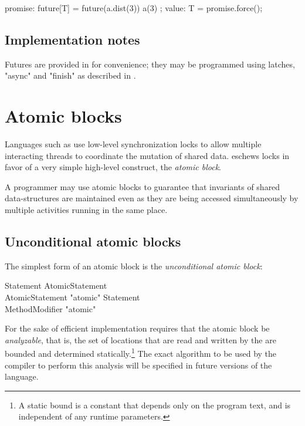 \begin{xten}
promise: future[T]
  = future(a.dist(3)) { a(3) };
value: T = promise.force();
\end{xten}

\subsection{Implementation notes}
Futures are provided in \Xten{} for convenience; they may be
programmed using latches, \xcd"async" and \xcd"finish" as
described in .

\section{Atomic blocks}\label{AtomicBlocks}
Languages such as \java{} use low-level synchronization locks to allow
multiple interacting threads to coordinate the mutation of shared
data. \Xten{} eschews locks in favor of a very simple high-level
construct, the {\em atomic block}.

A programmer may use atomic blocks to guarantee that invariants of
shared data-structures are maintained even as they are being accessed
simultaneously by multiple activities running in the same place.

\subsection{Unconditional atomic blocks}
The simplest form of an atomic block is the {\em unconditional
atomic block}:

\begin{grammar}
Statement \: AtomicStatement \\
AtomicStatement \: \xcd"atomic"  Statement \\
MethodModifier \: \xcd"atomic" \\
\end{grammar}

For the sake of efficient implementation \XtenCurrVer{} requires
that the atomic block be {\em analyzable}, that is, the set of
locations that are read and written by the  are
bounded and determined statically.\footnote{A static bound is a constant
that depends only on the program text, and is independent 
of any runtime parameters. }
The exact algorithm to be used by
the compiler to perform this analysis will be specified in future
versions of the language.
\tbd{}

